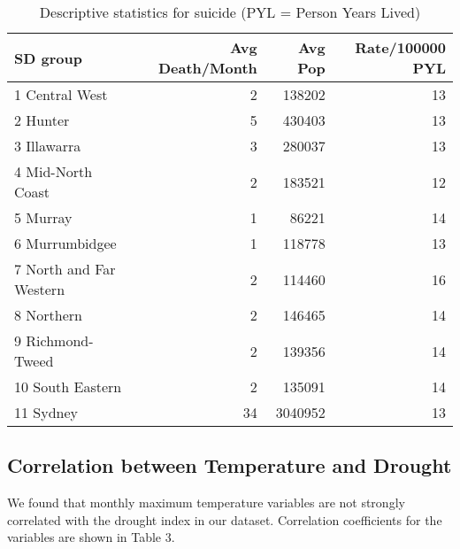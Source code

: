 \documentclass[a4paper]{article}                %
\begin{document}
        \begin{table}[!ht]
        \begin{center}
        \caption{Descriptive statistics for suicide (PYL = Person Years Lived)}
        \label{tab:tab2}
        \begin{tabular}{lrrr}
        \hline
        SD group & Avg Death/Month & Avg Pop & Rate/100000 PYL \\
        \hline
        1 Central West & 2 & 138202 & 13 \\
        2 Hunter & 5 & 430403 & 13 \\
        3 Illawarra & 3 & 280037 & 13 \\
        4 Mid-North Coast & 2 & 183521 & 12 \\
        5 Murray & 1 & 86221 & 14 \\
        6 Murrumbidgee & 1 & 118778 & 13 \\
        7 North and Far Western & 2 & 114460 & 16 \\
        8 Northern & 2 & 146465 & 14 \\
        9 Richmond-Tweed & 2 & 139356 & 14 \\
        10 South Eastern & 2 & 135091 & 14 \\
        11 Sydney & 34 & 3040952 & 13 \\
        \hline
        \end{tabular}
        \end{center}
        \end{table}

\clearpage

\subsection{Correlation between Temperature and Drought}

 We found that monthly maximum temperature variables are not strongly correlated with the drought index in our dataset.  Correlation coefficients for the variables are shown in Table 3.

\end{document}
